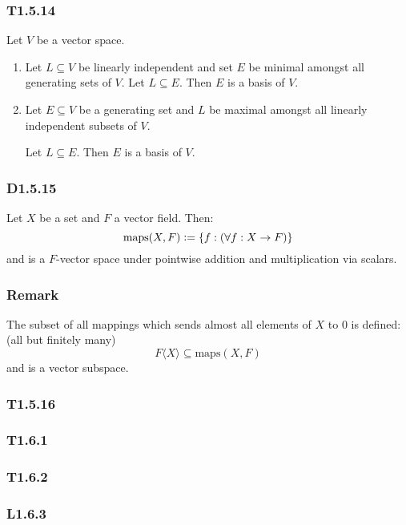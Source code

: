 \documentclass{article}
\newcommand{\deq}{\vcentcolon=}
\begin{document}
\begin{multicols*}{3}
\subsubsection*{T1.5.14}
Let $V$ be a vector space.
\begin{enumerate}
    \item Let $L\subseteq V$ be linearly independent and
    set $E$ be minimal amongst all generating sets of $V$.
    Let $L\subseteq E$.
    Then $E$ is a basis of $V$.

    \item Let $E\subseteq V$ be a generating set and
    $L$ be maximal amongst all linearly independent
    subsets of $V$. 
    
    Let $L\subseteq E$. Then $E$ is a basis of $V$.
\end{enumerate}

\subsubsection*{D1.5.15}
Let $X$ be a set and $F$ a vector field. Then:
$$\text{maps}(X,F)\deq\{f:(\forall f:X\rightarrow F)\}$$
and is a $F$-vector space under pointwise addition and
multiplication via scalars.

\subsubsection*{Remark}
The subset of all mappings which sends 
almost all elements of $X$ to $0$ is defined:
(all but finitely many)
$$F\langle X\rangle\subseteq\text{maps}(X,F)$$
and is a vector subspace.

\subsubsection*{T1.5.16}

\newcolumn

\subsubsection*{T1.6.1}

\subsubsection*{T1.6.2}

\subsubsection*{L1.6.3}


\end{multicols*}
\end{document}
